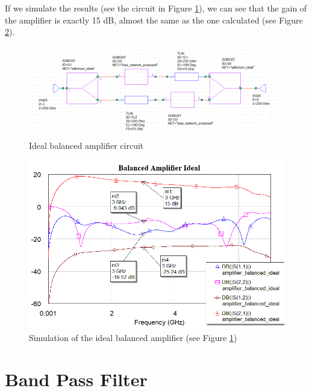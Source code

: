 \documentclass[12pt]{report} %
\begin{document}
If we simulate the results (see the circuit in Figure \ref{fig:design_circuit_elements:balanced_amplifier_ideal_circuit}), we can see that the gain of the amplifier is exactly 15 dB, almost the same as the one calculated (see Figure \ref{fig:design_circuit_elements:balanced_amplifier_ideal_graph}).

\begin{figure}[htbp]
    \centering
    \includegraphics[width=1\linewidth]{images//design_circuit_elements/balanced_amplifier_ideal_circuit.png}
    \caption{Ideal balanced amplifier circuit}
    \label{fig:design_circuit_elements:balanced_amplifier_ideal_circuit}
\end{figure}

\begin{figure}
    \centering
    \includegraphics[width=1\linewidth]{images//design_circuit_elements/balanced_amplifier_ideal_graph.png}
    \caption{Simulation of the ideal balanced amplifier (see Figure \ref{fig:design_circuit_elements:balanced_amplifier_ideal_circuit})}
    \label{fig:design_circuit_elements:balanced_amplifier_ideal_graph}
\end{figure}

\section{Band Pass Filter}
\end{document}
